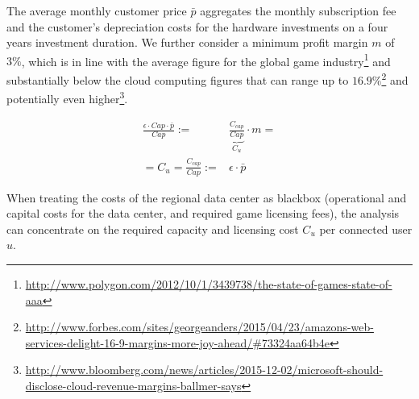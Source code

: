 The average monthly customer price $\bar{p}$ aggregates the monthly subscription fee and the customer's depreciation costs for the hardware investments on a four years investment duration. We further consider a minimum profit margin $m$ of $3 \%$, which is in line with the average figure for the global game industry\footnote{\url{http://www.polygon.com/2012/10/1/3439738/the-state-of-games-state-of-aaa}} and substantially below the cloud computing figures that can range up to $16.9\%$\footnote{\url{http://www.forbes.com/sites/georgeanders/2015/04/23/amazons-web-services-delight-16-9-margins-more-joy-ahead/\#73324aa64b4e}} and potentially even higher\footnote{\url{http://www.bloomberg.com/news/articles/2015-12-02/microsoft-should-disclose-cloud-revenue-margins-ballmer-says}}.


\begin{align} \label{eq:computational_efficiency}
	\frac{\epsilon \cdot Cap \cdot \bar{p}}{Cap} :=& \underbrace{\frac{C_{cap}}{Cap}}_{C_{u}} \cdot m =\\
	= C_{u} = \frac{C_{cap}}{Cap} :=& \epsilon \cdot \bar{p}
\end{align}

When treating the costs of the regional data center as blackbox (operational and capital costs for the data center, and required game licensing fees), the analysis can concentrate on the required capacity and licensing cost $C_{u}$ per connected user $u$.


